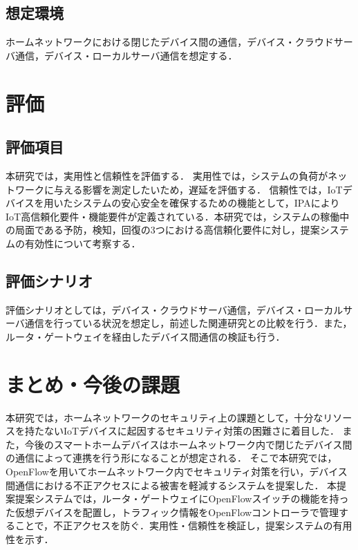 \documentclass[a4paper,10pt,twocolumn,uplatex]{jsarticle}
\begin{document}
\subsection{想定環境}
ホームネットワークにおける閉じたデバイス間の通信，デバイス・クラウドサーバ通信，デバイス・ローカルサーバ通信を想定する．

\section{評価}
\subsection{評価項目}
本研究では，実用性と信頼性を評価する．
実用性では，システムの負荷がネットワークに与える影響を測定したいため，遅延を評価する．
信頼性では，IoTデバイスを用いたシステムの安心安全を確保するための機能として，IPAによりIoT高信頼化要件・機能要件が定義されている\cite{IPA}．本研究では，システムの稼働中の局面である予防，検知，回復の3つにおける高信頼化要件に対し，提案システムの有効性について考察する．


\subsection{評価シナリオ}
評価シナリオとしては，デバイス・クラウドサーバ通信，デバイス・ローカルサーバ通信を行っている状況を想定し，前述した関連研究との比較を行う．また，ルータ・ゲートウェイを経由したデバイス間通信の検証も行う．

\section{まとめ・今後の課題}
本研究では，ホームネットワークのセキュリティ上の課題として，十分なリソースを持たないIoTデバイスに起因するセキュリティ対策の困難さに着目した．
また，今後のスマートホームデバイスはホームネットワーク内で閉じたデバイス間の通信によって連携を行う形になることが想定される．
そこで本研究では，OpenFlowを用いてホームネットワーク内でセキュリティ対策を行い，デバイス間通信における不正アクセスによる被害を軽減するシステムを提案した．
本提案提案システムでは，ルータ・ゲートウェイにOpenFlowスイッチの機能を持った仮想デバイスを配置し，トラフィック情報をOpenFlowコントローラで管理することで，不正アクセスを防ぐ．実用性・信頼性を検証し，提案システムの有用性を示す．
\end{document}
